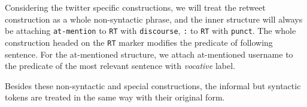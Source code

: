\documentclass[11pt,letterpaper]{article}
\begin{document}
Considering the twitter specific constructions, we will treat the retweet construction as a whole non-syntactic phrase, and the inner structure will always be attaching {\tt at-mention} to {\tt RT} with {\tt discourse}, {\tt :} to {\tt RT} with {\tt punct}.
The whole construction headed on the {\tt RT} marker modifies the predicate of following sentence.
For the at-mentioned structure, we attach at-mentioned username to the predicate of the most relevant sentence with {\it vocative} label.

Besides these non-syntactic and special constructions, the informal but syntactic tokens are treated in the same way with their original form.

\end{document}
